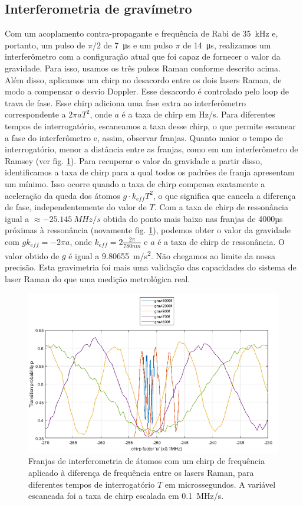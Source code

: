 \subsection{Interferometria de gravímetro}
Com um acoplamento contra-propagante e frequência de Rabi de \SI{35}{kHz} e, portanto, um pulso de $\pi/2$ de \SI{7}{\micro\second} e um pulso $\pi$ de \SI{14}{\micro\second}, realizamos um interferômetro com a configuração atual que foi capaz de fornecer o valor da gravidade. Para isso, usamos os três pulsos Raman conforme descrito acima. Além disso, aplicamos um chirp no desacordo entre os dois lasers Raman, de modo a compensar o desvio Doppler. Esse desacordo é controlado pelo loop de trava de fase. Esse chirp adiciona uma fase extra ao interferômetro correspondente a $2\pi a T^2$, onde $a$ é a taxa de chirp em Hz/s. Para diferentes tempos de interrogatório, escaneamos a taxa desse chirp, o que permite escanear a fase do interferômetro e, assim, observar franjas. Quanto maior o tempo de interrogatório, menor a distância entre as franjas, como em um interferômetro de Ramsey (ver fig. \ref{fig:gravi}). Para recuperar o valor da gravidade a partir disso, identificamos a taxa de chirp para a qual todos os padrões de franja apresentam um mínimo. Isso ocorre quando a taxa de chirp compensa exatamente a aceleração da queda dos átomos $g\cdot k_{eff}T^2$, o que significa que cancela a diferença de fase, independentemente do valor de $T$. Com a taxa de chirp de ressonância igual a $\approx \SI{-25.145}{MHz/s}$ obtida do ponto mais baixo nas franjas de 4000µs próximas à ressonância (novamente fig. \ref{fig:gravi}), podemos obter o valor da gravidade com $g k_{eff} = -2\pi a$, onde $k_{eff}=2\frac{2\pi}{780nm}$ e $a$ é a taxa de chirp de ressonância. O valor obtido de $g$ é igual a \SI{9.80655}{m/s^2}. Não chegamos ao limite da nossa precisão. Esta gravimetria foi mais uma validação das capacidades do sistema de laser Raman do que uma medição metrológica real.


\begin{figure}
    \centering
    \includegraphics[width=0.7\linewidth]{figures/centralFringeGravimeter.PNG}
    \caption{Franjas de interferometria de átomos com um chirp de frequência aplicado à diferença de frequência entre os lasers Raman, para diferentes tempos de interrogatório $T$ em microssegundos. A variável escaneada foi a taxa de chirp escalada em \SI{0.1}{MHz/s}.
}
    
    \label{fig:gravi}
\end{figure}




